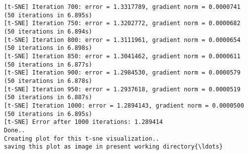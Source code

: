 \documentclass[11pt]{article}
\begin{document}
\begin{Verbatim}[commandchars=\\\{\}]
[t-SNE] Iteration 700: error = 1.3317789, gradient norm = 0.0000741 (50 iterations in 6.895s)
[t-SNE] Iteration 750: error = 1.3202772, gradient norm = 0.0000682 (50 iterations in 6.894s)
[t-SNE] Iteration 800: error = 1.3111961, gradient norm = 0.0000654 (50 iterations in 6.898s)
[t-SNE] Iteration 850: error = 1.3041462, gradient norm = 0.0000611 (50 iterations in 6.877s)
[t-SNE] Iteration 900: error = 1.2984530, gradient norm = 0.0000579 (50 iterations in 6.878s)
[t-SNE] Iteration 950: error = 1.2937618, gradient norm = 0.0000519 (50 iterations in 6.887s)
[t-SNE] Iteration 1000: error = 1.2894143, gradient norm = 0.0000500 (50 iterations in 6.895s)
[t-SNE] Error after 1000 iterations: 1.289414
Done..
Creating plot for this t-sne visualization..
saving this plot as image in present working directory{\ldots}

    \end{Verbatim}

    \begin{center}
    \end{center}
    { \hspace*{\fill} \\}
    
\end{document}
